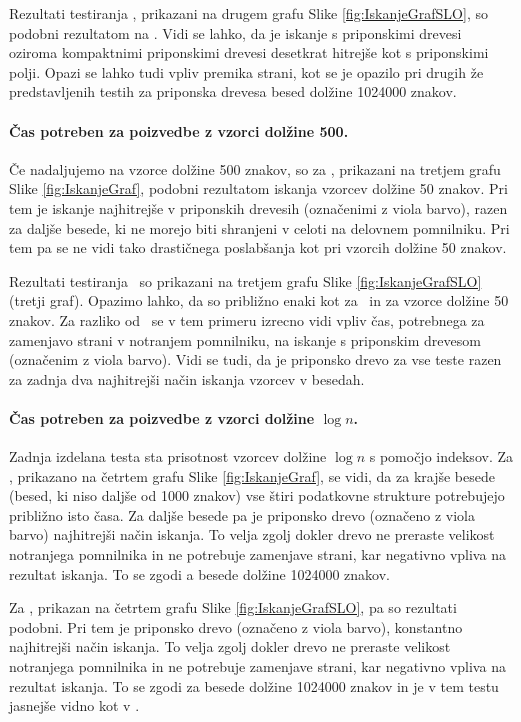 Rezultati testiranja \NK, prikazani na drugem grafu Slike \ref{fig:IskanjeGrafSLO}, so podobni rezultatom na \DNK. Vidi se lahko, da je iskanje s priponskimi drevesi oziroma kompaktnimi priponskimi drevesi desetkrat hitrejše kot s priponskimi polji. Opazi se lahko tudi vpliv premika strani, kot se je opazilo pri drugih že predstavljenih testih za priponska drevesa besed dolžine 1024000 znakov. 

\paragraph{Čas potreben za poizvedbe z vzorci dolžine 500.}
Če nadaljujemo na vzorce dolžine 500 znakov, so za \DNK, prikazani na tretjem grafu Slike \ref{fig:IskanjeGraf}, podobni rezultatom iskanja vzorcev dolžine 50 znakov. Pri tem je iskanje najhitrejše v priponskih drevesih (označenimi z viola barvo), razen za daljše besede, ki ne morejo biti shranjeni v celoti na delovnem pomnilniku. Pri tem pa se ne vidi tako drastičnega poslabšanja kot pri vzorcih dolžine 50 znakov.

Rezultati testiranja \NK\ so prikazani na tretjem grafu Slike \ref{fig:IskanjeGrafSLO} (tretji graf). Opazimo lahko, da so približno enaki kot za \DNK\ in za vzorce dolžine 50 znakov. Za razliko od \DNK\ se v tem primeru izrecno vidi vpliv čas, potrebnega za zamenjavo strani v notranjem pomnilniku, na iskanje s priponskim drevesom (označenim z viola barvo). Vidi se tudi, da je priponsko drevo za vse teste razen za zadnja dva najhitrejši način iskanja vzorcev v besedah.

\paragraph{Čas potreben za poizvedbe z vzorci dolžine $\log{n}$.}
Zadnja izdelana testa sta prisotnost vzorcev dolžine $\log{n}$ s pomočjo indeksov. Za \DNK, prikazano na četrtem grafu Slike \ref{fig:IskanjeGraf}, se vidi, da za krajše besede (besed, ki niso daljše od 1000 znakov) vse štiri podatkovne strukture potrebujejo približno isto časa. Za daljše besede pa je priponsko drevo (označeno z viola barvo) najhitrejši način iskanja. To velja zgolj dokler drevo ne preraste velikost notranjega pomnilnika in ne potrebuje zamenjave strani, kar negativno vpliva na rezultat iskanja. To se zgodi a besede dolžine 1024000 znakov.

Za \NK, prikazan na četrtem grafu Slike \ref{fig:IskanjeGrafSLO}, pa so rezultati podobni. Pri tem je priponsko drevo (označeno z viola barvo), konstantno najhitrejši način iskanja. To velja zgolj dokler drevo ne preraste velikost notranjega pomnilnika in ne potrebuje zamenjave strani, kar negativno vpliva na rezultat iskanja. To se zgodi za besede dolžine 1024000 znakov in  je v tem testu jasnejše vidno kot v \DNK.
